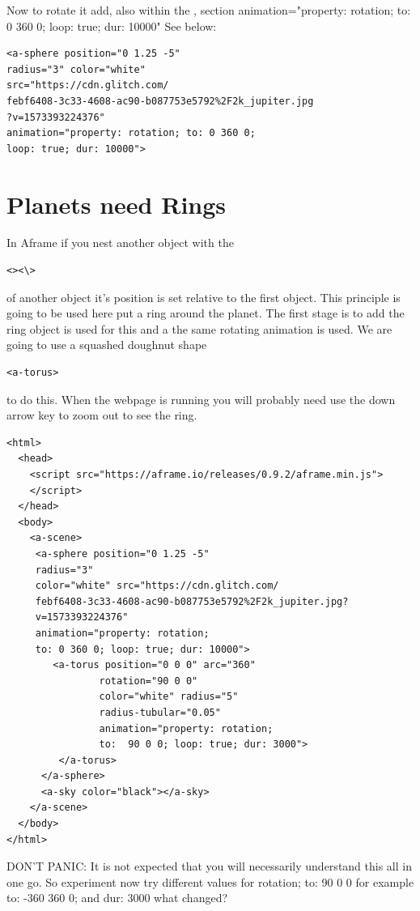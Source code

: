 Now to rotate it  add, also within the , section animation="property: rotation; to: 0 360 0; loop: true; dur: 10000" See below:

\begin{lstlisting}
<a-sphere position="0 1.25 -5" 
radius="3" color="white" 
src="https://cdn.glitch.com/
febf6408-3c33-4608-ac90-b087753e5792%2F2k_jupiter.jpg
?v=1573393224376"
animation="property: rotation; to: 0 360 0; 
loop: true; dur: 10000">
\end{lstlisting}

\section{Planets need Rings}
In Aframe if you nest another object with the 
\begin{lstlisting}<><\>\end{lstlisting} of another object it's position is set relative to the first object. This principle is going to be used here put a ring around the planet. The first stage is to add the ring object is used for this and a the same rotating animation is used. We are going to use a squashed doughnut shape
\begin{lstlisting}<a-torus>\end{lstlisting} to do this. When the webpage is running you will probably need use the down arrow key to zoom out to see the ring.

\begin{lstlisting}
<html>
  <head>
    <script src="https://aframe.io/releases/0.9.2/aframe.min.js">
    </script>
  </head>
  <body>
    <a-scene>
     <a-sphere position="0 1.25 -5" 
     radius="3" 
     color="white" src="https://cdn.glitch.com/
     febf6408-3c33-4608-ac90-b087753e5792%2F2k_jupiter.jpg?
     v=1573393224376"
     animation="property: rotation; 
     to: 0 360 0; loop: true; dur: 10000">
        <a-torus position="0 0 0" arc="360"
                rotation="90 0 0"
                color="white" radius="5"
                radius-tubular="0.05"
                animation="property: rotation; 
                to:  90 0 0; loop: true; dur: 3000">
         </a-torus>
      </a-sphere>   
      <a-sky color="black"></a-sky>
    </a-scene>
  </body>
</html>
\end{lstlisting}

DON'T PANIC: It is not expected that you will necessarily understand this all in one go. So experiment now try different values for rotation; to:  90 0 0  for example to:  -360 360 0; and dur: 3000 what changed? 

